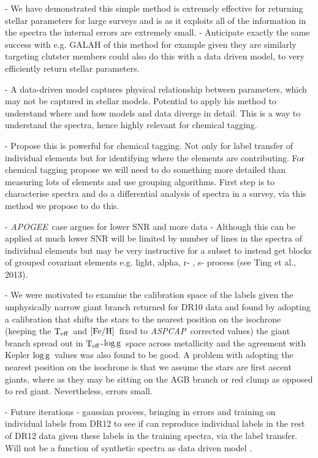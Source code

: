 \documentclass[12pt, preprint]{aastex}
\newcommand{\teff}{\mbox{$\rm T_{eff}$}}
\newcommand{\feh}{\mbox{$\rm [Fe/H]$}}
\newcommand{\logg}{\mbox{$\rm \log g$}}
\newcommand{\apogee}{\textsl{APOGEE}}
\newcommand{\aspcap}{\textsl{ASPCAP}}
\begin{document}
- We have demonstrated this simple method is extremely effective for returning stellar parameters for large surveys and is as it exploits all of the information in the spectra the internal errors are extremely small. - Anticipate exactly the same success with e.g. GALAH of this method for example given they are similarly targeting clutster members could also do this with a data driven model, to very efficiently return stellar parameters. 

- A data-driven model captures physical relationship between parameters, which may not be captured in stellar models. Potential to apply his method to understand where and how models and data diverge in detail. This is a way to understand the spectra, hence highly relevant for chemical tagging. 

- Propose this is powerful for chemical tagging. Not only for label transfer of individual elements but for identifying where the elements are contributing. For chemical tagging propose we will need to do something more detailed than measuring lots of elements and use grouping algorithms. First step is to characterise spectra and do a differential analysis of spectra in a survey, via this method we propose to do this. 

- \apogee\ case argues for lower SNR and more data - Although this can be applied at much lower SNR will be limited by number of lines in the spectra of individual elements but may be very instructive for a subset to instead get blocks of grouped covariant elements e.g. light, alpha, r- , s- process (see Ting et al., 2013).


- We were motivated to examine the calibration space of the labels given the unphysically narrow giant branch returned for DR10 data and found by adopting a calibration that shifts the stars to the nearest position on the isochrone (keeping the \teff\ and \feh\ fixed to \aspcap\ corrected values) the giant branch spread out in \teff-\logg\ space across metallicity and the agreement with Kepler \logg\ values was also found to be good. A problem with adopting the nearest position on the isochrone is that we assume the stars are first ascent giants, where as they may be sitting on the AGB branch or red clump as opposed to red giant. Nevertheless, errors small. 

- Future iterations - gaussian process, bringing in errors and training on individual labels from DR12 to see if can reproduce individual labels in the rest of DR12 data given these labels in the training spectra, via the label transfer. Will not be a function of synthetic spectra as data driven model . 
\end{document}

